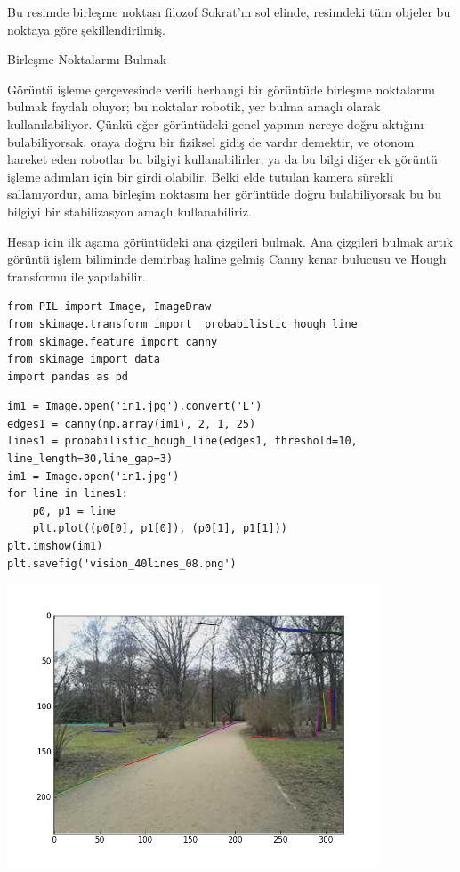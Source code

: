 \documentclass[12pt,fleqn]{article}\usepackage{../../common}
\begin{document}
Bu resimde birleşme noktası filozof Sokrat'ın sol elinde, resimdeki tüm
objeler bu noktaya göre şekillendirilmiş.

Birleşme Noktalarını Bulmak

Görüntü işleme çerçevesinde verili herhangi bir görüntüde birleşme
noktalarını bulmak faydalı oluyor; bu noktalar robotik, yer bulma amaçlı
olarak kullanılabiliyor. Çünkü eğer görüntüdeki genel yapının nereye doğru
aktığını bulabiliyorsak, oraya doğru bir fiziksel gidiş de vardır demektir,
ve otonom hareket eden robotlar bu bilgiyi kullanabilirler, ya da bu bilgi
diğer ek görüntü işleme adımları için bir girdi olabilir. Belki elde
tutulan kamera sürekli sallanıyordur, ama birleşim noktasını her görüntüde
doğru bulabiliyorsak bu bu bilgiyi bir stabilizasyon amaçlı kullanabiliriz.

Hesap icin ilk aşama görüntüdeki ana çizgileri bulmak. Ana çizgileri bulmak
artık görüntü işlem biliminde demirbaş haline gelmiş Canny kenar bulucusu
ve Hough transformu ile yapılabilir.

\begin{verbatim}
from PIL import Image, ImageDraw
from skimage.transform import  probabilistic_hough_line
from skimage.feature import canny
from skimage import data
import pandas as pd
\end{verbatim}

\begin{verbatim}
im1 = Image.open('in1.jpg').convert('L')
edges1 = canny(np.array(im1), 2, 1, 25)
lines1 = probabilistic_hough_line(edges1, threshold=10, line_length=30,line_gap=3)
im1 = Image.open('in1.jpg')
for line in lines1:
    p0, p1 = line
    plt.plot((p0[0], p1[0]), (p0[1], p1[1]))
plt.imshow(im1)
plt.savefig('vision_40lines_08.png')
\end{verbatim}

\includegraphics[width=30em]{vision_40lines_08.png}
\end{document}
